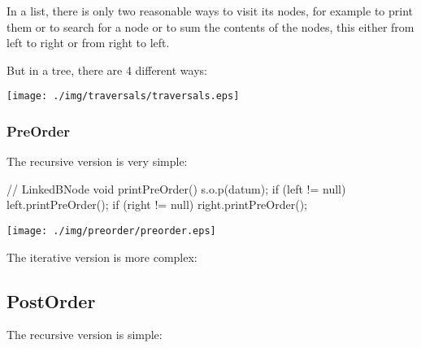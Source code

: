 \documentclass[a4paper, 9pt]{extarticle}
\begin{document}
In a list, there is only two reasonable ways to visit its nodes,
for example to print them
or to search for a node
or to sum the contents of the nodes,
this either from left to right or from right to left.

But in a tree, there are 4 different ways:



\begin{center}
  \texttt{[image: ./img/traversals/traversals.eps]}
\end{center}


\subsubsection{PreOrder}

The recursive version is very simple:

\begin{multicols}{2}
\begin{blackboard}
// LinkedBNode
void printPreOrder() {
  s.o.p(datum);
  if (left != null) {
    left.printPreOrder();
  }
  if (right != null) {
    right.printPreOrder();
  }
}
\end{blackboard}
\columnbreak
\texttt{[image: ./img/preorder/preorder.eps]}
\end{multicols}

The iterative version is more complex:


\subsection{PostOrder}

The recursive version is simple:
\end{document}
